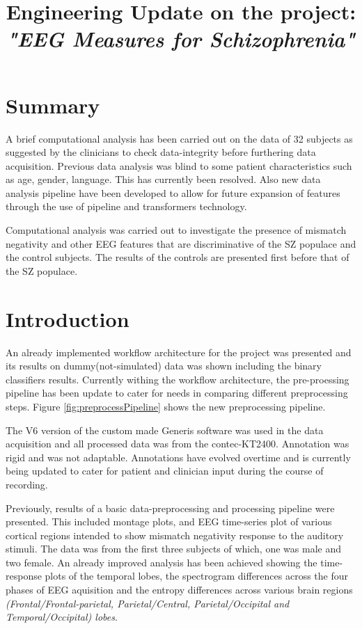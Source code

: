 \documentclass[10pt]{article}
\title{Engineering Update on the project: \textit{\textbf{"EEG Measures for Schizophrenia"}}}
\begin{document}
\maketitle


\section{Summary}\label{sec:summary}
A brief computational analysis has been carried out on the data of 32 subjects as suggested by the clinicians to check data-integrity before furthering data acquisition. 
  Previous data analysis was blind to some patient characteristics such as age, gender, language. This has currently been resolved. Also new data analysis pipeline 
  have been developed to allow for future expansion of features through the use of pipeline and transformers technology.

  Computational analysis was carried out to investigate the presence of mismatch negativity and other EEG features that are discriminative of the SZ populace and the control subjects.
  The results of the controls are presented first before that of the SZ populace.


\section{Introduction}\label{sec:intro}
An already implemented workflow architecture for the project was presented and its results on dummy(not-simulated) data was shown 
including the binary classifiers results. Currently withing the workflow architecture, the pre-proessing pipeline
has been update to cater for needs in comparing different preprocessing steps. Figure \ref{fig:preprocessPipeline} shows the 
new preprocessing pipeline.

The V6 version of the custom made Generis software was used in the data acquisition and all processed data was from the contec-KT2400.
Annotation was rigid and was not adaptable. Annotations have evolved overtime and is currently being updated to cater for patient 
and clinician input during the course of recording.

Previously, results of a basic data-preprocessing and processing pipeline were presented. This included montage plots, and EEG time-series plot of various
cortical regions intended to show mismatch negativity response to the auditory stimuli. The data was from the first three subjects of which, one was male and two female.
An already improved analysis has been achieved showing the time-response plots of the temporal lobes,
the spectrogram differences across the four phases of EEG aquisition and the entropy differences across
various brain regions \textit{(Frontal/Frontal-parietal, Parietal/Central, Parietal/Occipital and Temporal/Occipital) lobes}.
\end{document}

